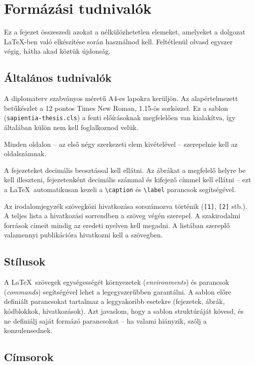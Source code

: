 \chapter{Formázási tudnivalók}

Ez a fejezet összeszedi azokat a nélkülözhetetlen elemeket, amelyeket a dolgozat
\LaTeX-ben való elkészítése során használnod kell. Feltétlenül olvasd egyszer
végig, hátha akad köztük újdonság.

\section{Általános tudnivalók}

A diplomaterv szabványos méretű A4-es lapokra kerüljön. Az alapértelmezett
betűkészlet a 12 pontos Times New Roman, 1.15-ös sorközzel. Ez a sablon
(\texttt{sapientia-thesis.cls}) a fenti előírásoknak megfelelően van
kialakítva, így általában külön nem kell foglalkoznod velük.

Minden oldalon -- az első négy szerkezeti elem kivételével -- szerepelnie kell
az oldalszámnak.

A fejezeteket decimális beosztással kell ellátni. Az ábrákat a megfelelő helyre
be kell illeszteni, fejezetenként decimális számmal és kifejező címmel kell
ellátni -- ezt a \LaTeX\ automatikusan kezeli a \verb|\caption| és
\verb|\label| parancsok segítségével.

Az irodalomjegyzék szövegközi hivatkozása sorszámozva történik (\texttt{[1]},
\texttt{[2]} stb.). A teljes lista a hivatkozási sorrendben a szöveg végén
szerepel. A szakirodalmi források címeit mindig az eredeti nyelven kell
megadni. A listában szereplő valamennyi publikációra hivatkozni kell a
szövegben.

\section{Stílusok}

A \LaTeX\ szövegek egységességét környezetek (\textit{environments}) és
parancsok (\textit{commands}) segítségével lehet a legegyszerűbben garantálni.
A sablon előre definiált parancsokat tartalmaz a leggyakoribb esetekre
(fejezetek, ábrák, kódblokkok, hivatkozások). Azt javaslom, hogy a sablon
struktúráját kövesd, és ne definiálj saját formázó parancsokat -- ha valami
hiányzik, szólj a konzulensednek.

\section{Címsorok}


